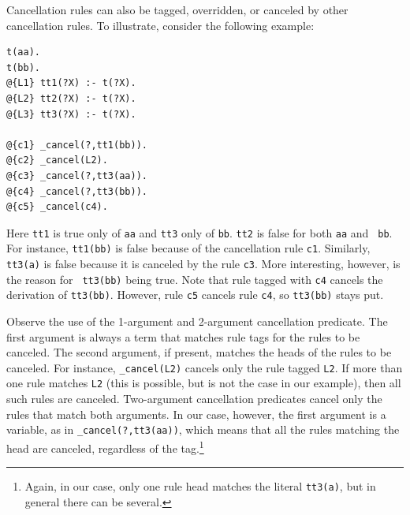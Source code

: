 \documentclass[11pt]{article}
\begin{document}
Cancellation rules can also be tagged, overridden,
or canceled by other cancellation
rules. To illustrate,  consider the following example:
\begin{verbatim}
t(aa).
t(bb).
@{L1} tt1(?X) :- t(?X).
@{L2} tt2(?X) :- t(?X).
@{L3} tt3(?X) :- t(?X).

@{c1} _cancel(?,tt1(bb)).
@{c2} _cancel(L2).
@{c3} _cancel(?,tt3(aa)).
@{c4} _cancel(?,tt3(bb)).
@{c5} _cancel(c4).
\end{verbatim}
Here {\tt tt1} is true only of {\tt aa} and  
{\tt tt3} only of {\tt bb}. {\tt tt2} is false for both {\tt aa} and {\tt
  bb}. For instance, {\tt tt1(bb)} is false because of the cancellation
rule {\tt c1}. Similarly, {\tt tt3(a)} is false because it is canceled by
the rule {\tt c3}.   More interesting, however, is the reason for {\tt
  tt3(bb)} being true. Note that rule tagged with {\tt c4} cancels the
derivation of {\tt tt3(bb)}. However, rule {\tt c5} cancels rule {\tt c4},
so {\tt tt3(bb)} stays put.

Observe the use of the 1-argument and 2-argument cancellation predicate.
The first argument is always a term that matches rule tags for the rules
to be canceled. The second
argument, if present, matches the heads of the rules to be canceled. For
instance, {\tt \_cancel(L2)} cancels only the rule tagged {\tt L2}. If more
than one rule matches {\tt L2} (this is possible, but is not the case in
our example), then all such rules are canceled. Two-argument cancellation
predicates cancel only the rules that match both arguments. In our case,
however, the first argument is a variable, as in {\tt \_cancel(?,tt3(aa))},
which means that all the rules matching the head are canceled, regardless
of the tag.\footnote{
  Again, in our case, only one rule head matches the literal {\tt tt3(a)},
  but in general there can be several.
}
\end{document}
